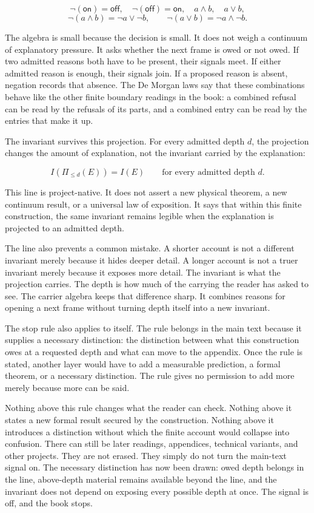 \[
\neg(\mathsf{on})=\mathsf{off},\quad
\neg(\mathsf{off})=\mathsf{on},\quad
a\wedge b,\quad a\vee b,
\]
\[
\neg(a\wedge b)=\neg a\vee \neg b,\qquad
\neg(a\vee b)=\neg a\wedge \neg b.
\]

The algebra is small because the decision is small. It does not weigh a
continuum of explanatory pressure. It asks whether the next frame is owed or
not owed. If two admitted reasons both have to be present, their signals meet.
If either admitted reason is enough, their signals join. If a proposed reason is
absent, negation records that absence. The De Morgan laws say that these
combinations behave like the other finite boundary readings in the book: a
combined refusal can be read by the refusals of its parts, and a combined entry
can be read by the entries that make it up.

The invariant survives this projection. For every admitted depth \(d\), the
projection changes the amount of explanation, not the invariant carried by the
explanation:

\[
I(\Pi_{\le d}(E)) = I(E)
\qquad\text{for every admitted depth }d.
\]

This line is project-native. It does not assert a new physical theorem, a new
continuum result, or a universal law of exposition. It says that within this
finite construction, the same invariant remains legible when the explanation is
projected to an admitted depth.

The line also prevents a common mistake. A shorter account is not a different
invariant merely because it hides deeper detail. A longer account is not a
truer invariant merely because it exposes more detail. The invariant is what
the projection carries. The depth is how much of the carrying the reader has
asked to see. The carrier algebra keeps that difference sharp. It combines
reasons for opening a next frame without turning depth itself into a new
invariant.

The stop rule also applies to itself. The rule belongs in the main text because
it supplies a necessary distinction: the distinction between what this
construction owes at a requested depth and what can move to the appendix. Once
the rule is stated, another layer would have to add a measurable prediction, a
formal theorem, or a necessary distinction. The rule gives no permission to add
more merely because more can be said.

Nothing above this rule changes what the reader can check. Nothing above it
states a new formal result secured by the construction. Nothing above it
introduces a distinction without which the finite account would collapse into
confusion. There can still be later readings, appendices, technical variants,
and other projects. They are not erased. They simply do not turn the main-text
signal on. The necessary distinction has now been drawn: owed depth belongs in
the line, above-depth material remains available beyond the line, and the
invariant does not depend on exposing every possible depth at once. The signal
is off, and the book stops.

